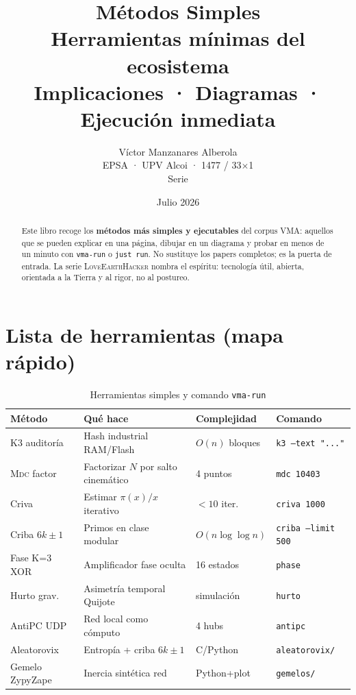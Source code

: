 \documentclass[11pt,a4paper,twoside]{book}
\title{%
  {\Huge\bfseries Métodos Simples}\\[0.6em]
  {\Large Herramientas mínimas del ecosistema \VMA}\\[1.2em]
  {\normalsize Implicaciones · Diagramas · Ejecución inmediata}
}
\author{%
  Víctor Manzanares Alberola\\
  \small EPSA · UPV Alcoi · 1477 / 33$\times$1\\[0.4em]
  \small Serie \LoveEarthHacker
}
\date{Julio 2026}
\newcommand{\LoveEarthHacker}{\textsc{LoveEarthHacker}}
\newcommand{\VMA}{VMA}
\newcommand{\MDC}{\textsc{Mdc}}
\begin{document}
\frontmatter
\maketitle

\begin{abstract}
Este libro recoge los \textbf{métodos más simples y ejecutables} del corpus
\VMA: aquellos que se pueden explicar en una página, dibujar en un diagrama
y probar en menos de un minuto con \texttt{vma-run} o \texttt{just run}.
No sustituye los papers completos; es la puerta de entrada.
La serie \LoveEarthHacker{} nombra el espíritu: tecnología útil, abierta,
orientada a la Tierra y al rigor, no al postureo.
\end{abstract}

\tableofcontents
\listoffigures
\listoftables

\mainmatter

\chapter{Lista de herramientas (mapa rápido)}

\begin{table}[htbp]
\centering
\caption{Herramientas simples y comando \texttt{vma-run}}
\label{tab:herramientas}
\begin{tabular}{@{}llll@{}}
\toprule
\textbf{Método} & \textbf{Qué hace} & \textbf{Complejidad} & \textbf{Comando} \\
\midrule
K3 auditoría    & Hash industrial RAM/Flash & $O(n)$ bloques & \texttt{k3 --text "..."} \\
\MDC{} factor   & Factorizar $N$ por salto cinemático & 4 puntos & \texttt{mdc 10403} \\
Criva           & Estimar $\pi(x)/x$ iterativo & $<10$ iter. & \texttt{criva 1000} \\
Criba 6$k{\pm}1$ & Primos en clase modular & $O(n\log\log n)$ & \texttt{criba --limit 500} \\
Fase K=3 XOR    & Amplificador fase oculta & 16 estados & \texttt{phase} \\
Hurto grav.     & Asimetría temporal Quijote & simulación & \texttt{hurto} \\
AntiPC UDP      & Red local como cómputo & 4 hubs & \texttt{antipc} \\
Aleatorovix     & Entropía + criba 6$k{\pm}1$ & C/Python & \texttt{aleatorovix/} \\
Gemelo ZypyZape & Inercia sintética red & Python+plot & \texttt{gemelos/} \\
\bottomrule
\end{tabular}
\end{table}
\end{document}
